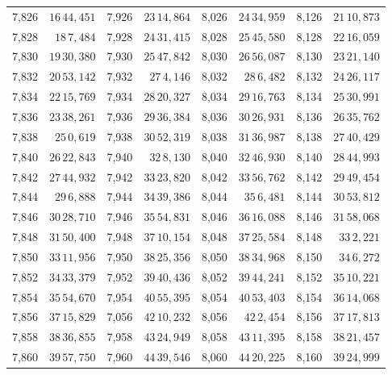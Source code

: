 \begin{tabular}{|r|r||r|r||r|r||r|r|}
7,826 & \(16\,44,\!451\) & 7,926 & \(23\,14,\!864\) & 8,026 & \(24\,34,\!959\) & 8,126 & \(21\,10,\!873\) \\
7,828 & \(18\,7,\!484\) & 7,928 & \(24\,31,\!415\) & 8,028 & \(25\,45,\!580\) & 8,128 & \(22\,16,\!059\) \\
7,830 & \(19\,30,\!380\) & 7,930 & \(25\,47,\!842\) & 8,030 & \(26\,56,\!087\) & 8,130 & \(23\,21,\!140\) \\[1pt]
7,832 & \(20\,53,\!142\) & 7,932 & \(27\,4,\!146\) & 8,032 & \(28\,6,\!482\) & 8,132 & \(24\,26,\!117\) \\
7,834 & \(22\,15,\!769\) & 7,934 & \(28\,20,\!327\) & 8,034 & \(29\,16,\!763\) & 8,134 & \(25\,30,\!991\) \\
7,836 & \(23\,38,\!261\) & 7,936 & \(29\,36,\!384\) & 8,036 & \(30\,26,\!931\) & 8,136 & \(26\,35,\!762\) \\
7,838 & \(25\,0,\!619\) & 7,938 & \(30\,52,\!319\) & 8,038 & \(31\,36,\!987\) & 8,138 & \(27\,40,\!429\) \\
7,840 & \(26\,22,\!843\) & 7,940 & \(32\,8,\!130\) & 8,040 & \(32\,46,\!930\) & 8,140 & \(28\,44,\!993\) \\[1pt]
7,842 & \(27\,44,\!932\) & 7,942 & \(33\,23,\!820\) & 8,042 & \(33\,56,\!762\) & 8,142 & \(29\,49,\!454\) \\
7,844 & \(29\,6,\!888\) & 7,944 & \(34\,39,\!386\) & 8,044 & \(35\,6,\!481\) & 8,144 & \(30\,53,\!812\) \\
7,846 & \(30\,28,\!710\) & 7,946 & \(35\,54,\!831\) & 8,046 & \(36\,16,\!088\) & 8,146 & \(31\,58,\!068\) \\
7,848 & \(31\,50,\!400\) & 7,948 & \(37\,10,\!154\) & 8,048 & \(37\,25,\!584\) & 8,148 & \(33\,2,\!221\) \\
7,850 & \(33\,11,\!956\) & 7,950 & \(38\,25,\!356\) & 8,050 & \(38\,34,\!968\) & 8,150 & \(34\,6,\!272\) \\[1pt]
7,852 & \(34\,33,\!379\) & 7,952 & \(39\,40,\!436\) & 8,052 & \(39\,44,\!241\) & 8,152 & \(35\,10,\!221\) \\
7,854 & \(35\,54,\!670\) & 7,954 & \(40\,55,\!395\) & 8,054 & \(40\,53,\!403\) & 8,154 & \(36\,14,\!068\) \\
7,856 & \(37\,15,\!829\) & 7,056 & \(42\,10,\!232\) & 8,056 & \(42\,2,\!454\) & 8,156 & \(37\,17,\!813\) \\
7,858 & \(38\,36,\!855\) & 7,958 & \(43\,24,\!949\) & 8,058 & \(43\,11,\!395\) & 8,158 & \(38\,21,\!457\) \\
7,860 & \(39\,57,\!750\) & 7,960 & \(44\,39,\!546\) & 8,060 & \(44\,20,\!225\) & 8,160 & \(39\,24,\!999\) \\[1pt]

\end{tabular}
